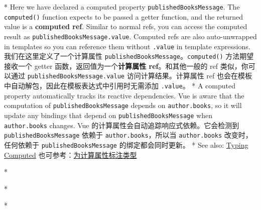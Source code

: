 \begin{paracol}{2}
\switchcolumn[0]*%
Here we have declared a computed property
\texttt{publishedBooksMessage}. The \texttt{computed()} function expects
to be passed a getter function, and the returned value is a
\textbf{computed ref}. Similar to normal refs, you can access the
computed result as \texttt{publishedBooksMessage.value}. Computed refs
are also auto-unwrapped in templates so you can reference them without
\texttt{.value} in template expressions.
\switchcolumn
我们在这里定义了一个计算属性
\texttt{publishedBooksMessage}。\texttt{computed()} 方法期望接收一个
getter 函数，返回值为一个\textbf{计算属性 ref}。和其他一般的 ref
类似，你可以通过 \texttt{publishedBooksMessage.value}
访问计算结果。计算属性 ref
也会在模板中自动解包，因此在模板表达式中引用时无需添加 \texttt{.value}。
\switchcolumn[0]*%
A computed property automatically tracks its reactive dependencies. Vue
is aware that the computation of \texttt{publishedBooksMessage} depends
on \texttt{author.books}, so it will update any bindings that depend on
\texttt{publishedBooksMessage} when \texttt{author.books} changes.
\switchcolumn
Vue 的计算属性会自动追踪响应式依赖。它会检测到
\texttt{publishedBooksMessage} 依赖于 \texttt{author.books}，所以当
\texttt{author.books} 改变时，任何依赖于 \texttt{publishedBooksMessage}
的绑定都会同时更新。
\switchcolumn[0]*%
See also:
\href{https://vuejs.org/guide/typescript/composition-api.html\#typing-computed}{Typing
Computed}
\switchcolumn
也可参考：\href{https://cn.vuejs.org/guide/typescript/composition-api.html\#typing-computed}{为计算属性标注类型}
\end{paracol}




\switchcolumn[0]*%
\begin{vueQuote}{}
\end{vueQuote} 
\switchcolumn
\begin{vueQuote}{}
\end{vueQuote} 

\switchcolumn[0]*%
\begin{codeJs}

\end{codeJs}  
\switchcolumn
\begin{codeJs}

\end{codeJs}  


\switchcolumn[0]*%
\begin{codeHtml}

\end{codeHtml}  
\switchcolumn
\begin{codeHtml}

\end{codeHtml}  